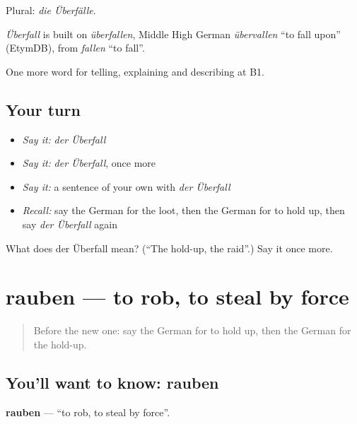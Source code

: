 Plural: \emph{die Überfälle}.

\begin{cousinweb}
\emph{Überfall} is built on \emph{überfallen}, Middle High German \emph{übervallen} \textquotedblleft{}to fall upon\textquotedblright{} (EtymDB), from \emph{fallen} \textquotedblleft{}to fall\textquotedblright{}.
\end{cousinweb}

\begin{grammarlens}[title={What you've built}]
One more word for telling, explaining and describing at B1.
\end{grammarlens}

\subsection*{Your turn}
\begin{itemize}
\raggedright
  \item \emph{Say it:} \emph{der Überfall}
  \item \emph{Say it:} \emph{der Überfall}, once more
  \item \emph{Say it:} a sentence of your own with \emph{der Überfall}
  \item \emph{Recall:} say the German for the loot, then the German for to hold up, then say \emph{der Überfall} again
\end{itemize}

\begin{tcolorbox}[breakable,colback=teal!4,colframe=teal!35!black,title={Before you move on}]
What does der Überfall mean? (\textquotedblleft{}The hold-up, the raid\textquotedblright{}.) Say it once more.
\end{tcolorbox}
\section[rauben]{rauben — to rob, to steal by force}

\label{lesson:GE-C282-rauben}



\begin{quote}
Before the new one: say the German for to hold up, then the German for the hold-up.
\end{quote}

\subsection*{You'll want to know: rauben}
\textbf{rauben} — \textquotedblleft{}to rob, to steal by force\textquotedblright{}.

